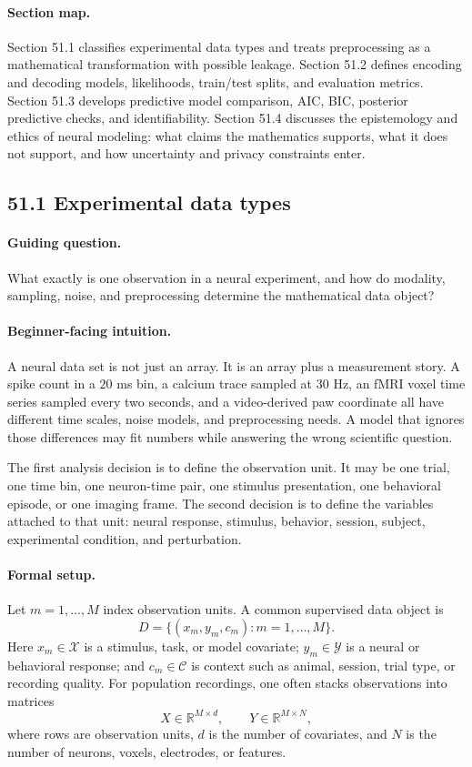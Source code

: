 \paragraph{Section map.}
Section 51.1 classifies experimental data types and treats preprocessing as a mathematical transformation with possible leakage. Section 51.2 defines encoding and decoding models, likelihoods, train/test splits, and evaluation metrics. Section 51.3 develops predictive model comparison, AIC, BIC, posterior predictive checks, and identifiability. Section 51.4 discusses the epistemology and ethics of neural modeling: what claims the mathematics supports, what it does not support, and how uncertainty and privacy constraints enter.

\subsection{51.1 Experimental data types}

\paragraph{Guiding question.}
What exactly is one observation in a neural experiment, and how do modality, sampling, noise, and preprocessing determine the mathematical data object?

\paragraph{Beginner-facing intuition.}
A neural data set is not just an array. It is an array plus a measurement story. A spike count in a \(20\) ms bin, a calcium trace sampled at \(30\) Hz, an fMRI voxel time series sampled every two seconds, and a video-derived paw coordinate all have different time scales, noise models, and preprocessing needs. A model that ignores those differences may fit numbers while answering the wrong scientific question.

The first analysis decision is to define the observation unit. It may be one trial, one time bin, one neuron-time pair, one stimulus presentation, one behavioral episode, or one imaging frame. The second decision is to define the variables attached to that unit: neural response, stimulus, behavior, session, subject, experimental condition, and perturbation.

\paragraph{Formal setup.}
Let \(m=1,\ldots,M\) index observation units. A common supervised data object is
\[
D=\{(x_m,y_m,c_m):m=1,\ldots,M\}.
\]
Here \(x_m\in\mathcal X\) is a stimulus, task, or model covariate; \(y_m\in\mathcal Y\) is a neural or behavioral response; and \(c_m\in\mathcal C\) is context such as animal, session, trial type, or recording quality. For population recordings, one often stacks observations into matrices
\[
X\in\mathbb R^{M\times d},\qquad Y\in\mathbb R^{M\times N},
\]
where rows are observation units, \(d\) is the number of covariates, and \(N\) is the number of neurons, voxels, electrodes, or features.


